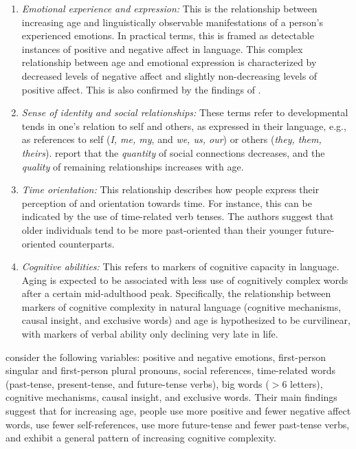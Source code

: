 \begin{enumerate}
    \item \textit{Emotional experience and expression:} This is the relationship between increasing age and linguistically observable manifestations of a person's experienced emotions. In practical terms, this is framed as detectable instances of positive and negative affect in language. This complex relationship between age and emotional expression is characterized by decreased levels of negative affect and slightly non-decreasing levels of positive affect. This is also confirmed by the findings of \cite{schler2006effects}.
    
    \item \textit{Sense of identity and social relationships:} These terms refer to developmental tends in one's relation to self and others, as expressed in their language, e.g., as references to self (\textit{I, me, my}, and \textit{we, us, our}) or others (\textit{they, them, theirs}). \cite{pennebaker2003words} report that the \textit{quantity} of social connections decreases, and the \textit{quality} of remaining relationships increases with age.
    
    \item \textit{Time orientation:} This relationship describes how people express their perception of and orientation towards time. For instance, this can be indicated by the use of time-related verb tenses. The authors suggest that older individuals tend to be more past-oriented than their younger future-oriented counterparts.
    
    \item \textit{Cognitive abilities:} This refers to markers of cognitive capacity in language. Aging is expected to be associated with less use of cognitively complex words after a certain mid-adulthood peak. Specifically, the relationship between markers of cognitive complexity in natural language (cognitive mechanisms, causal insight, and exclusive words) and age is hypothesized to be curvilinear, with markers of verbal ability only declining very late in life. 
\end{enumerate}

\cite{pennebaker2003words} consider the following variables: positive and negative emotions, first-person singular and first-person plural pronouns, social references, time-related words (past-tense, present-tense, and future-tense verbs), big words ($>6$ letters), cognitive mechanisms, causal insight, and exclusive words. Their main findings suggest that for increasing age, people use more positive and fewer negative affect words, use fewer self-references, use more future-tense and fewer past-tense verbs, and exhibit a general pattern of increasing cognitive complexity.

